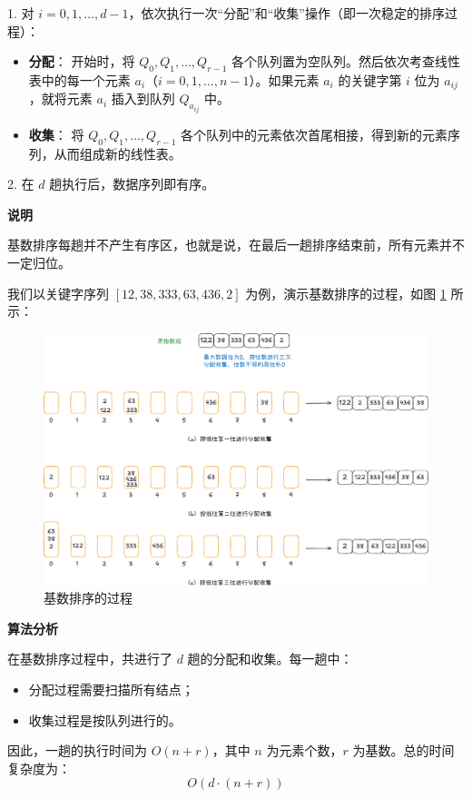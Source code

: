 \documentclass[lang=cn,newtx,10pt,scheme=chinese]{../elegantbook}
\begin{document}
1. 对 $i = 0, 1, \dots, d-1$，依次执行一次“分配”和“收集”操作（即一次稳定的排序过程）：
   \begin{itemize}
     \item \textbf{分配}：  
       开始时，将 $Q_0, Q_1, \dots, Q_{r-1}$ 各个队列置为空队列。然后依次考查线性表中的每一个元素 $a_i$（$i = 0, 1, \dots, n-1$）。如果元素 $a_i$ 的关键字第 $i$ 位为 $a_{ij}$，就将元素 $a_i$ 插入到队列 $Q_{a_{ij}}$ 中。
     \item \textbf{收集}：  
       将 $Q_0, Q_1, \dots, Q_{r-1}$ 各个队列中的元素依次首尾相接，得到新的元素序列，从而组成新的线性表。
   \end{itemize}

2. 在 $d$ 趟执行后，数据序列即有序。



\textbf{说明}  

基数排序每趟并不产生有序区，也就是说，在最后一趟排序结束前，所有元素并不一定归位。

我们以关键字序列 $[12,38,333,63,436,2]$ 为例，演示基数排序的过程，如图 \ref{fig:radixSort} 所示：

\begin{figure}[h!]
    \centering
    \includegraphics[width=1\textwidth]{./figure/pdf/cropped/radixSort.pdf}
    \caption{基数排序的过程}
    \label{fig:radixSort}
\end{figure}

\textbf{算法分析}

在基数排序过程中，共进行了 $d$ 趟的分配和收集。每一趟中：
\begin{itemize}
  \item 分配过程需要扫描所有结点；
  \item 收集过程是按队列进行的。
\end{itemize}
因此，一趟的执行时间为 $O(n + r)$，其中 $n$ 为元素个数，$r$ 为基数。总的时间复杂度为：
\[
O(d \cdot (n + r))
\]
\end{document}
